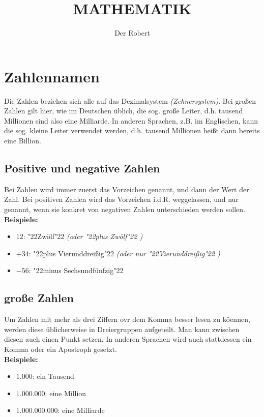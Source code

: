 \documentclass[a4paper]{article}
\newcommand{\q}[1]{\char"22{#1}\char"22 }
\begin{document}
\setlength{\parindent}{0mm}

\title{\textbf{MATHEMATIK}}
\author{Der Robert}
\maketitle

\tableofcontents

\newpage
\section{Zahlennamen}
Die Zahlen beziehen sich alle auf das Dezimalsystem \textit{(Zehnersystem)}.
Bei gro{\ss}en Zahlen gilt hier,
wie im Deutschen \"ublich,
die sog. gro{\ss}e Leiter,
d.h. tausend Millionen sind also eine Milliarde.
In anderen Sprachen,
z.B. im Englischen,
kann die sog. kleine Leiter verwendet werden,
d.h. tausend Millionen hei{\ss}t dann bereits eine Billion.

\subsection{Positive und negative Zahlen}
Bei Zahlen wird immer zuerst das Vorzeichen genannt,
und dann der Wert der Zahl.
Bei positiven Zahlen wird das Vorzeichen i.d.R. weggelassen,
und nur genannt,
wenn sie konkret von negativen Zahlen unterschieden werden sollen.
\\
\textbf{Beispiele:}
\begin{itemize}[nosep]
	\item $12$: \q{Zw\"olf} \textit{(oder \q{plus Zw\"olf})}
	\item $+34$: \q{plus Vierunddrei{\ss}ig} \textit{(oder nur \q{Vierunddrei{\ss}ig})}
	\item $-56$: \q{minus Sechsundf\"unfzig}
\end{itemize}

\subsection{gro{\ss}e Zahlen}
Um Zahlen mit mehr als drei Ziffern ovr dem Komma besser lesen zu k\"oennen,
werden diese \"ublicherweise in Dreiergruppen aufgeteilt.
Man kann zwischen diesen auch einen Punkt setzen.
In anderen Sprachen wird auch stattdessen ein Komma oder ein Apostroph gesetzt.
\\
\textbf{Beispiele:}
\begin{itemize}[nosep]
	\item $ 1.000 $: ein Tausend
	\item $ 1.000.000 $: eine Million
	\item $ 1.000.000.000 $: eine Milliarde
\end{itemize}
\end{document}
